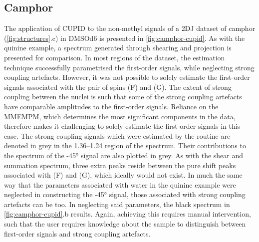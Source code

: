 \subsection{Camphor}
The application of \ac{CUPID} to the non-methyl signals of a \ac{2DJ}
dataset of camphor (\cref{fig:structures}.c) in \acs{DMSOd6} is presented
in \cref{fig:camphor-cupid}. As with the quinine example, a spectrum
generated through shearing and projection is presented for
comparison. In most regions of the dataset, the estimation technique
successfully parametrised the first-order signals, while neglecting strong
coupling artefacts. However, it was not possible to solely estimate the
first-order signals associated with the pair of spins (F) and (G). The extent
of strong coupling between the nuclei is such that some of the strong coupling
artefacts have comparable amplitudes to the first-order signals. Reliance on
the
\ac{MMEMPM}, which determines the most significant components in
the data, therefore makes it challenging to solely estimate the first-order
signals in this case. The strong coupling signals which were estimated by the
routine are denoted in grey in the \SIrange{1.36}{1.24}{\partspermillion} region
of the spectrum. Their contributions to the spectrum of the \ang{-45} signal
are also plotted in grey. As with the shear and summation spectrum, three extra
peaks reside between the pure shift peaks associated with (F) and (G), which
ideally would not exist. In much the same way that the parameters associated
with water in the quinine example were neglected in constructing the \ang{-45}
signal, those associated with strong coupling artefacts can be too.
In neglecting said parameters, the black spectrum in \cref{fig:camphor-cupid}.b
results. Again, achieving this requires manual intervention, such that the user
requires knowledge about the sample to distinguish between first-order signals
and strong coupling artefacts.

